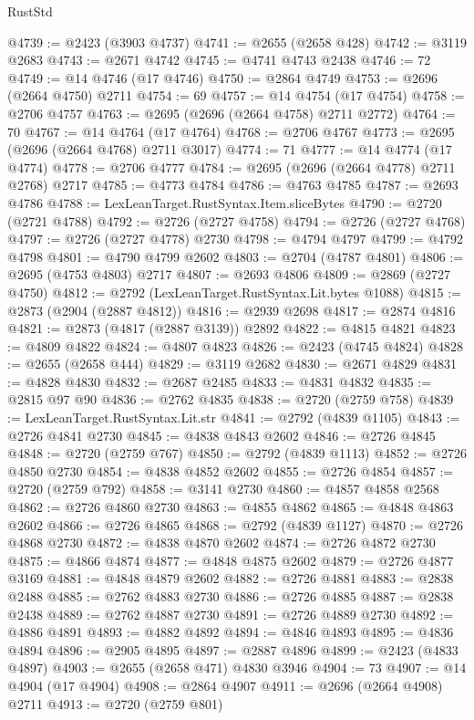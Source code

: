 \begin{lexlean}{RustStd}
\begin{coremodule}
@4739 := @2423 (@3903 @4737)
@4741 := @2655 (@2658 @428)
@4742 := @3119 @2683
@4743 := @2671 @4742
@4745 := @4741 @4743 @2438
@4746 := 72
@4749 := @14 @4746 (@17 @4746)
@4750 := @2864 @4749
@4753 := @2696 (@2664 @4750) @2711
@4754 := 69
@4757 := @14 @4754 (@17 @4754)
@4758 := @2706 @4757
@4763 := @2695 (@2696 (@2664 @4758) @2711 @2772)
@4764 := 70
@4767 := @14 @4764 (@17 @4764)
@4768 := @2706 @4767
@4773 := @2695 (@2696 (@2664 @4768) @2711 @3017)
@4774 := 71
@4777 := @14 @4774 (@17 @4774)
@4778 := @2706 @4777
@4784 := @2695 (@2696 (@2664 @4778) @2711 @2768) @2717
@4785 := @4773 @4784
@4786 := @4763 @4785
@4787 := @2693 @4786
@4788 := LexLeanTarget.RustSyntax.Item.sliceBytes
@4790 := @2720 (@2721 @4788)
@4792 := @2726 (@2727 @4758)
@4794 := @2726 (@2727 @4768)
@4797 := @2726 (@2727 @4778) @2730
@4798 := @4794 @4797
@4799 := @4792 @4798
@4801 := @4790 @4799 @2602
@4803 := @2704 (@4787 @4801)
@4806 := @2695 (@4753 @4803) @2717
@4807 := @2693 @4806
@4809 := @2869 (@2727 @4750)
@4812 := @2792 (LexLeanTarget.RustSyntax.Lit.bytes @1088)
@4815 := @2873 (@2904 (@2887 @4812))
@4816 := @2939 @2698
@4817 := @2874 @4816
@4821 := @2873 (@4817 (@2887 @3139)) @2892
@4822 := @4815 @4821
@4823 := @4809 @4822
@4824 := @4807 @4823
@4826 := @2423 (@4745 @4824)
@4828 := @2655 (@2658 @444)
@4829 := @3119 @2682
@4830 := @2671 @4829
@4831 := @4828 @4830
@4832 := @2687 @2485
@4833 := @4831 @4832
@4835 := @2815 @97 @90
@4836 := @2762 @4835
@4838 := @2720 (@2759 @758)
@4839 := LexLeanTarget.RustSyntax.Lit.str
@4841 := @2792 (@4839 @1105)
@4843 := @2726 @4841 @2730
@4845 := @4838 @4843 @2602
@4846 := @2726 @4845
@4848 := @2720 (@2759 @767)
@4850 := @2792 (@4839 @1113)
@4852 := @2726 @4850 @2730
@4854 := @4838 @4852 @2602
@4855 := @2726 @4854
@4857 := @2720 (@2759 @792)
@4858 := @3141 @2730
@4860 := @4857 @4858 @2568
@4862 := @2726 @4860 @2730
@4863 := @4855 @4862
@4865 := @4848 @4863 @2602
@4866 := @2726 @4865
@4868 := @2792 (@4839 @1127)
@4870 := @2726 @4868 @2730
@4872 := @4838 @4870 @2602
@4874 := @2726 @4872 @2730
@4875 := @4866 @4874
@4877 := @4848 @4875 @2602
@4879 := @2726 @4877 @3169
@4881 := @4848 @4879 @2602
@4882 := @2726 @4881
@4883 := @2838 @2488
@4885 := @2762 @4883 @2730
@4886 := @2726 @4885
@4887 := @2838 @2438
@4889 := @2762 @4887 @2730
@4891 := @2726 @4889 @2730
@4892 := @4886 @4891
@4893 := @4882 @4892
@4894 := @4846 @4893
@4895 := @4836 @4894
@4896 := @2905 @4895
@4897 := @2887 @4896
@4899 := @2423 (@4833 @4897)
@4903 := @2655 (@2658 @471) @4830 @3946
@4904 := 73
@4907 := @14 @4904 (@17 @4904)
@4908 := @2864 @4907
@4911 := @2696 (@2664 @4908) @2711
@4913 := @2720 (@2759 @801)

\end{coremodule}
\end{lexlean}
